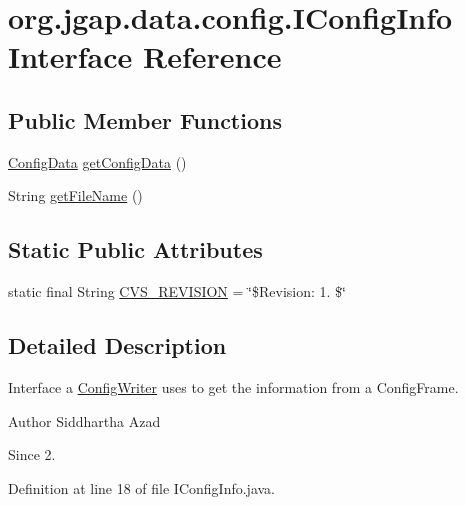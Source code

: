 \hypertarget{interfaceorg_1_1jgap_1_1data_1_1config_1_1_i_config_info}{\section{org.\-jgap.\-data.\-config.\-I\-Config\-Info Interface Reference}
\label{interfaceorg_1_1jgap_1_1data_1_1config_1_1_i_config_info}
}
\subsection*{Public Member Functions}
\begin{DoxyCompactItemize}
\item 
\hyperlink{classorg_1_1jgap_1_1data_1_1config_1_1_config_data}{Config\-Data} \hyperlink{interfaceorg_1_1jgap_1_1data_1_1config_1_1_i_config_info_a0778523001b1f1a661f67287693a8de5}{get\-Config\-Data} ()
\item 
String \hyperlink{interfaceorg_1_1jgap_1_1data_1_1config_1_1_i_config_info_a9c2e49decd80ca78ba63e5c9fb4d6736}{get\-File\-Name} ()
\end{DoxyCompactItemize}
\subsection*{Static Public Attributes}
\begin{DoxyCompactItemize}
\item 
static final String \hyperlink{interfaceorg_1_1jgap_1_1data_1_1config_1_1_i_config_info_ad43643ae9c6d1601963113583db6af25}{C\-V\-S\-\_\-\-R\-E\-V\-I\-S\-I\-O\-N} = \char`\"{}\$Revision\-: 1. \$\char`\"{}
\end{DoxyCompactItemize}


\subsection{Detailed Description}
Interface a \hyperlink{classorg_1_1jgap_1_1data_1_1config_1_1_config_writer}{Config\-Writer} uses to get the information from a Config\-Frame.

\begin{DoxyAuthor}{Author}
Siddhartha Azad 
\end{DoxyAuthor}
\begin{DoxySince}{Since}
2. 
\end{DoxySince}


Definition at line 18 of file I\-Config\-Info.\-java.



